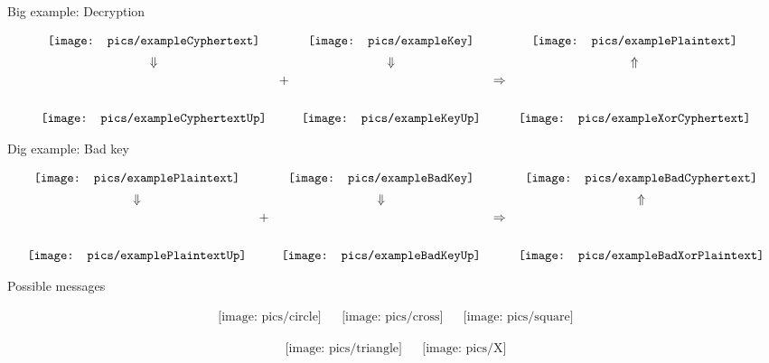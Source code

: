 \documentclass{beamer}
\newcommand{\exampleCyphertext}{\mathord{\texttt{[image: pics/exampleCyphertext]}}}
\newcommand{\exampleCyphertextUp}{\mathord{\texttt{[image: pics/exampleCyphertextUp]}}}
\newcommand{\exampleKey}{\mathord{\texttt{[image: pics/exampleKey]}}}
\newcommand{\exampleKeyUp}{\mathord{\texttt{[image: pics/exampleKeyUp]}}}
\newcommand{\examplePlaintext}{\mathord{\texttt{[image: pics/examplePlaintext]}}}
\newcommand{\examplePlaintextUp}{\mathord{\texttt{[image: pics/examplePlaintextUp]}}}
\newcommand{\exampleXorCyphertext}{\mathord{\texttt{[image: pics/exampleXorCyphertext]}}}
\newcommand{\exampleBadCyphertext}{\mathord{\texttt{[image: pics/exampleBadCyphertext]}}}
\newcommand{\exampleBadKey}{\mathord{\texttt{[image: pics/exampleBadKey]}}}
\newcommand{\exampleBadKeyUp}{\mathord{\texttt{[image: pics/exampleBadKeyUp]}}}
\newcommand{\exampleBadXorCyphertext}{\mathord{\texttt{[image: pics/exampleBadXorPlaintext]}}}
\newcommand{\mesCircle}{\mathord{\texttt{[image: pics/circle]}}}
\newcommand{\mesCross}{\mathord{\texttt{[image: pics/cross]}}}
\newcommand{\mesSquare}{\mathord{\texttt{[image: pics/square]}}}
\newcommand{\mesTriangle}{\mathord{\texttt{[image: pics/triangle]}}}
\newcommand{\mesX}{\mathord{\texttt{[image: pics/X]}}}
\begin{document}
\begin{frame}{Big example: Decryption}

\begin{equation*}
\begin{array}{ccccc}
\exampleCyphertext & & \exampleKey & & \examplePlaintext \vspace{0.5em}\\
\Downarrow &  & \Downarrow& & \Uparrow \vspace{0.5em}\\
\exampleCyphertextUp & \raisebox{7ex}{+} & \exampleKeyUp & \raisebox{7ex}{$\Rightarrow$} & \exampleXorCyphertext
\end{array}
\end{equation*}

\end{frame}



\begin{frame}{Dig example: Bad key}

\begin{equation*}
\begin{array}{ccccc}
\examplePlaintext &  & \exampleBadKey & & \exampleBadCyphertext \vspace{0.5em}\\
\Downarrow &  & \Downarrow& & \Uparrow \vspace{0.5em}\\
\examplePlaintextUp & \raisebox{7ex}{+} & \exampleBadKeyUp & \raisebox{7ex}{$\Rightarrow$} & \exampleBadXorCyphertext
\end{array}
\end{equation*}

\end{frame}


\begin{frame}{Possible messages}

\begin{equation*}
\begin{array}{ccccc}
\mesCircle &  & \mesCross & & \mesSquare
\end{array}
\end{equation*}

\begin{equation*}
\begin{array}{ccccc}
\mesTriangle &  & \mesX
\end{array}
\end{equation*}

\end{frame}
\end{document}
